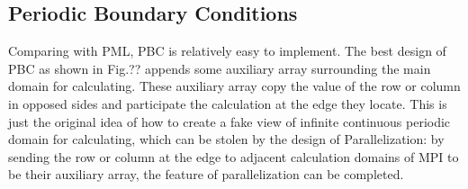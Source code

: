 \subsection{Periodic Boundary Conditions}
Comparing with PML, PBC is relatively easy to implement.  The best design of PBC as shown in Fig.?? appends some
auxiliary array surrounding the main domain for calculating. These auxiliary array copy the value of the row or column
in opposed sides and participate the calculation at the edge they locate. This is just the original idea of how to
create a fake view of infinite continuous periodic domain for calculating, which can be stolen by the design of
Parallelization: by sending the row or column at the edge to adjacent calculation domains of MPI to be their auxiliary
array, the feature of parallelization can be completed.
